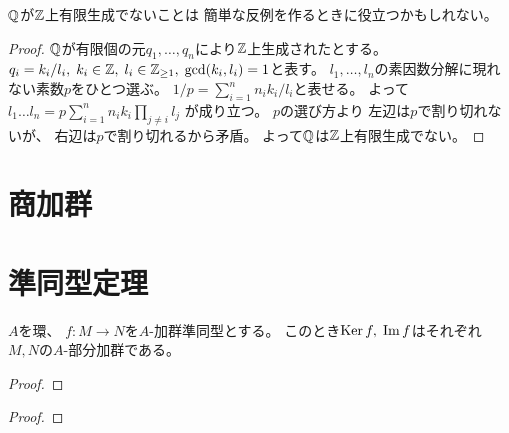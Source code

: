 \documentclass[report]{jlreq}
\begin{document}
$\mathbb{Q}$が$\mathbb{Z}$上有限生成でないことは
簡単な反例を作るときに役立つかもしれない。


\begin{proof}
    $\mathbb{Q}$が有限個の元$q_1, \dots, q_n$により$\mathbb{Z}$上生成されたとする。
    $q_i = k_i / l_i, \;
        k_i \in \mathbb{Z}, \;
        l_i \in \mathbb{Z}_{\ge 1}, \;
        \gcd(k_i, l_i) = 1$と表す。
    $l_1, \dots, l_n$の素因数分解に現れない素数$p$をひとつ選ぶ。
    $1 / p = \sum_{i = 1}^n n_i k_i / l_i$と表せる。
    よって
    $l_1 \dots l_n = p \sum_{i = 1}^n n_i k_i \prod_{j \neq i} l_j$
    が成り立つ。
    $p$の選び方より
    左辺は$p$で割り切れないが、
    右辺は$p$で割り切れるから矛盾。
    よって$\mathbb{Q}$は$\mathbb{Z}$上有限生成でない。
\end{proof}

%
\section{商加群}

\begin{definition}[商加群]
    \TODO{}
\end{definition}


%
\section{準同型定理}

\begin{proposition}[加群準同型の像と核]
    $A$を環、
    $f \colon M \to N$を$A$-加群準同型とする。
    このとき$\operatorname{\mathrm{Ker}} f, \; \operatorname{\mathrm{Im}} f$はそれぞれ
    $M, N$の$A$-部分加群である。
\end{proposition}

\begin{proof}
    \TODO{}
\end{proof}

\begin{theorem}[準同型定理]
    \TODO{}
\end{theorem}

\begin{proof}
    \TODO{}
\end{proof}
\end{document}
